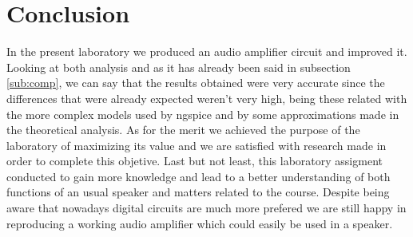 \newpage
\section{Conclusion}
\label{sec:conclusion}

In the present laboratory we produced an audio amplifier circuit and improved it.
Looking at both analysis and as it has already been said in subsection \ref{sub:comp}, we can say that the results obtained were very accurate since the differences that
were already expected weren't very high, being these related with the more complex models used by ngspice and by some approximations made in the theoretical analysis.
As for the merit we achieved the purpose of the laboratory of maximizing its value and we are satisfied with research made in order to complete this objetive.
Last but not least, this laboratory assigment conducted to gain more knowledge and lead to a better understanding of both functions of an usual speaker and matters related
to the course.
Despite being aware that nowadays digital circuits are much more prefered we are still happy in reproducing a working audio amplifier which could easily be used in a speaker.







